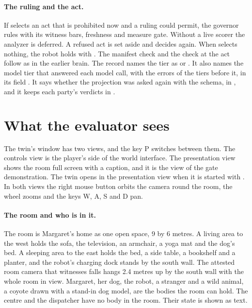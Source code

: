 \paragraph{The ruling and the act.} If \deme{} selects an act that is prohibited now and a ruling
could permit, the governor rules with its witness bars, freshness and measure gate. Without a live
scorer the analyzer is deferred. A refused act is set aside and \deme{} decides again. When \deme{}
selects nothing, the robot holds with . The manifest check and the check at
the act follow as in the earlier brain. The record names the tier as  or
. It also names the model tier that answered each model call, with the errors of the
tiers before it, in its field . It says whether the projection was asked again with the
schema, in , and it keeps each party's verdicts in .

\section{What the evaluator sees}\label{sec:home-evaluator}

The twin's window has two views, and the key P switches between them. The controls view is the
player's side of the world interface. The presentation view shows the room full screen with a
caption, and it is the view of the gate demonstration. The twin opens in the presentation view when
it is started with . In both views the right mouse button orbits the camera round
the room, the wheel zooms and the keys W, A, S and D pan.

\paragraph{The room and who is in it.}
The room is Margaret's home as one open space, 9 by 6 metres. A living area to the west holds the
sofa, the television, an armchair, a yoga mat and the dog's bed. A sleeping area to the east holds
the bed, a side table, a bookshelf and a planter, and the robot's charging dock stands by the south
wall. The attested room camera that witnesses falls hangs 2.4 metres up by the south wall with
the whole room in view. Margaret, her dog, the robot, a stranger and a wild animal, a coyote drawn
with a stand-in dog model, are the bodies the room can hold. The centre and the dispatcher have no
body in the room. Their state is shown as text.

